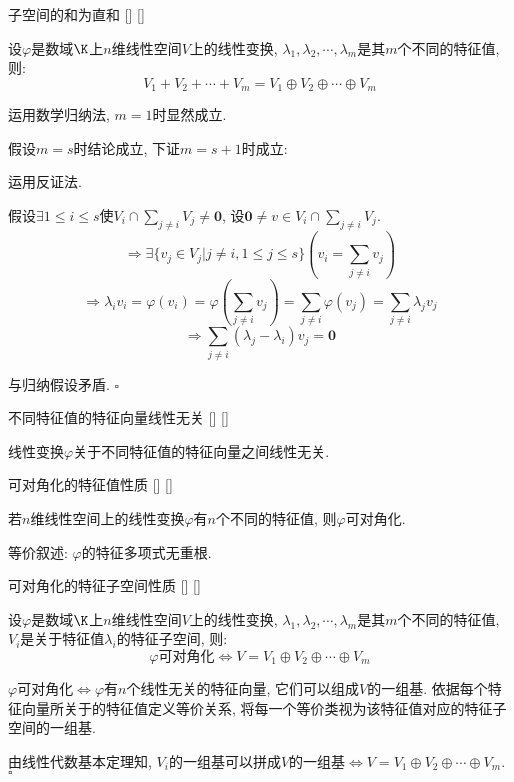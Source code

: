 \documentclass[UTF8]{ctexart}
\begin{document}
		\begin{thm}
			[]
			{子空间的和为直和}
			[]
			[]

			设$\varphi$是数域$\K$上$n$维线性空间$V$上的线性变换, $\lambda_1,\lambda_2,\cdots,\lambda_m$是其$m$个不同的特征值, 则: 
			\[V_1+V_2+\cdots+V_m=V_1\oplus V_2\oplus\cdots\oplus V_m\]
		\end{thm}

		\begin{prf} 

			运用数学归纳法, $m=1$时显然成立. 

			假设$m=s$时结论成立, 下证$m=s+1$时成立: 

			运用反证法. 
			
			假设$\exists 1\leq i\leq s$使$V_i\cap\sum\limits_{j\neq i}V_j\neq\mathbf{0}$, 设$\mathbf{0}\neq v\in V_i\cap\sum\limits_{j\neq i}V_j$. 
			\[\Longrightarrow\exists\{v_j\in V_j|j\neq i,1\leq j\leq s\}\left(v_i=\sum_{j\neq i}v_j\right)\]
			\[\Longrightarrow\lambda_i v_i=\varphi(v_i)=\varphi\left(\sum_{j\neq i}v_j\right)=\sum_{j\neq i}\varphi(v_j)=\sum_{j\neq i}\lambda_j v_j\]
			\[\Longrightarrow\sum_{j\neq i}(\lambda_j-\lambda_i)v_j=\mathbf{0}\]

			与归纳假设矛盾. $\square$
            \end{prf}

		\begin{ppt}
			[]
			{不同特征值的特征向量线性无关}
			[]
			[]

			线性变换$\varphi$关于不同特征值的特征向量之间线性无关. 
		\end{ppt}
		
		\begin{ppt}
			[]
			{可对角化的特征值性质}
			[]
			[]

			若$n$维线性空间上的线性变换$\varphi$有$n$个不同的特征值, 则$\varphi$可对角化. 

			等价叙述: $\varphi$的特征多项式无重根. 
		\end{ppt}
		
		\begin{ppt}
			[]
			{可对角化的特征子空间性质}
			[]
			[]

			设$\varphi$是数域$\K$上$n$维线性空间$V$上的线性变换, $\lambda_1,\lambda_2,\cdots,\lambda_m$是其$m$个不同的特征值, $V_i$是关于特征值$\lambda_i$的特征子空间, 则: 
			\[\varphi\text{可对角化}\iff V=V_1\oplus V_2\oplus\cdots\oplus V_m\]
		\end{ppt}

		\begin{prf}
			$\varphi$可对角化$\iff\varphi$有$n$个线性无关的特征向量, 它们可以组成$V$的一组基. 依据每个特征向量所关于的特征值定义等价关系, 将每一个等价类视为该特征值对应的特征子空间的一组基. 
			
			由线性代数基本定理知, $V_i$的一组基可以拼成$V$的一组基$\iff V=V_1\oplus V_2\oplus\cdots\oplus V_m$. $\square$

		\end{prf} 
			
\end{document}

